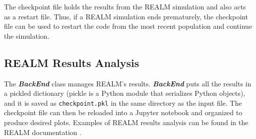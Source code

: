The checkpoint file holds the results from the REALM simulation and also acts 
as a restart file. 
Thus, if a REALM simulation ends prematurely, the checkpoint file can be used 
to restart the code from the most recent population and continue the simulation. 

\subsection{REALM Results Analysis}
The \textbf{\textit{BackEnd}} class manages REALM's results. 
\textbf{\textit{BackEnd}} puts all the results in a pickled dictionary 
(pickle is a Python module that serializes Python objects), and it is saved as 
\texttt{checkpoint.pkl} in the same directory as the input file. 
The checkpoint file can then be reloaded into a Jupyter notebook and organized 
to produce desired plots. 
Examples of REALM results analysis can be found in the REALM documentation 
\cite{chee_arfcrealm_2021}. 



